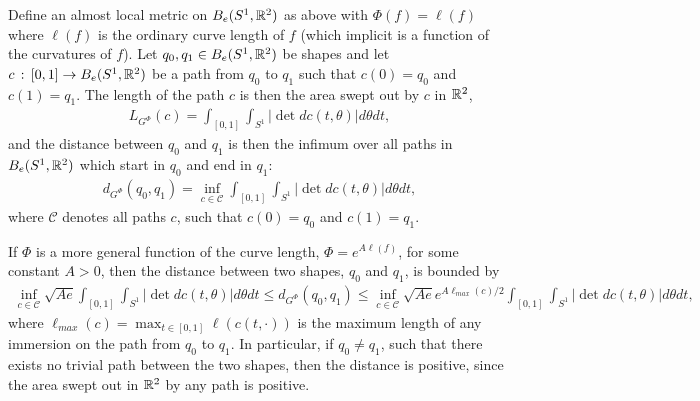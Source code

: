 \begin{example}
Define an almost local metric on $B_e(S^1, \mathbb{R}^2)$ as above with $\Phi(f) = \ell(f)$ where $\ell(f)$ is the ordinary curve length of $f$ (which implicit is a function of the curvatures of $f$). Let $q_0, q_1 \in B_e(S^1, \mathbb{R}^2)$ be shapes and let $c \, : \, [0,1] \rightarrow B_e(S^1, \mathbb{R}^2)$ be a path from $q_0$ to $q_1$ such that $c(0) = q_0$ and $c(1) = q_1$. The length of the path $c$ is then the area swept out by $c$ in $\mathbb{R}^2$,
\begin{align*}
L_{G^\Phi}(c) = \int_{[0,1]} \int_{S^1} \left| \det dc(t, \theta) \right| d\theta dt,
\end{align*}
and the distance between $q_0$ and $q_1$ is then the infimum over all paths in $B_e(S^1, \mathbb{R}^2)$ which start in $q_0$ and end in $q_1$:
\begin{align*}
d_{G^\Phi}(q_0, q_1) = \inf_{c\in\mathcal{C}} \int_{[0,1]} \int_{S^1} \left| \det dc(t, \theta) \right| d\theta dt,
\end{align*}
where $\mathcal{C}$ denotes all paths $c$, such that $c(0) =q_0$ and $c(1) =q_1$. \\[0.2 cm]
\end{example}

\begin{example}
If $\Phi$ is a more general function of the curve length, $\Phi = e^{A \ell (f)}$, for some constant $A > 0$, then the distance between two shapes, $q_0$ and $q_1$, is bounded by
\begin{align*}
\inf_{c\in\mathcal{C}} \sqrt{A e} \int_{[0,1]} \int_{S^1} \left| \det dc(t, \theta) \right| d\theta dt \leq d_{G^\Phi}(q_0, q_1) \leq \inf_{c\in\mathcal{C}} \sqrt{A e} e^{A \ell_{max}(c) / 2} \int_{[0,1]} \int_{S^1} \left| \det dc(t, \theta) \right| d\theta dt,
\end{align*}
where $\ell_{max} (c) = \max_{t \in [0,1]} \ell (c(t, \cdot))$ is the maximum length of any immersion on the path from $q_0$ to $q_1$. In particular, if $q_0 \neq q_1$, such that there exists no trivial path between the two shapes, then the distance is positive, since the area swept out in $\mathbb{R}^2$ by any path is positive. 
\end{example}




